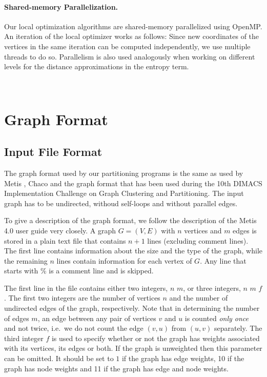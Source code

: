 \documentclass[11pt]{article}
\newcommand{\ie}{i.e.\ }
\begin{document}
\paragraph{Shared-memory Parallelization.}
%
Our local optimization algorithms are shared-memory parallelized using OpenMP.
An iteration of the local optimizer works as follows: Since new coordinates of the vertices in the same iteration can be computed independently, we use multiple threads to do so. 
Parallelism is also used analogously when working on different levels for the distance approximations
in the entropy term.



\vfill
\pagebreak
\,
\pagebreak
\section{Graph Format}
\label{ss:graphformat}
\subsection{Input File Format}
The graph format used by our partitioning programs is the same as used by Metis \cite{karypis1998fast}, Chaco \cite{chaco} and the graph format that has been used during the 10th DIMACS Implementation Challenge on Graph Clustering and Partitioning. 
The input graph has to be undirected, withoud self-loops and without parallel edges.

To give a description of the graph format, we follow the description of the Metis 4.0 user guide very closely. A graph $G=(V,E)$ with $n$ vertices and $m$ edges is stored in a plain text file that contains $n+1$ lines (excluding comment lines). The first line contains information about the size and the type of the graph, while the remaining $n$ lines contain information for each vertex of $G$. Any line that starts with \% is a comment line and is skipped.

The first line in the file contains either two integers, $n$ $m$, or three integers, $n$ $m$ $f$. The first two integers are the number of vertices $n$ and the number of undirected edges of the graph, respectively. Note that in determining the number of edges $m$, an edge between any pair of vertices $v$ and $u$ is counted \emph{only once} and not twice, \ie we do not count the edge $(v,u)$ from $(u,v)$ separately. The third integer $f$ is used to specify whether or not the graph has weights associated with its vertices, its edges or both. If the graph is unweighted then this parameter can be omitted. It should be set to $1$ if the graph has edge weights, 10 if the graph has node weights and 11 if the graph has edge and node weights.
\end{document}
